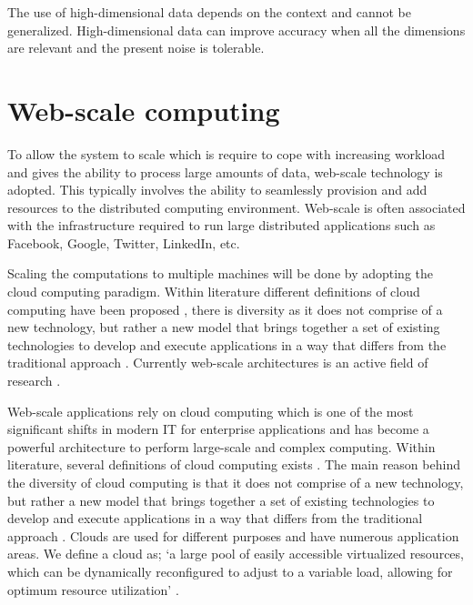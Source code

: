 The use of high-dimensional data depends on the context and cannot be generalized. High-dimensional data can improve accuracy when all the dimensions are relevant and the present noise is tolerable.


\section{Web-scale computing \label{sec:webscale}}

To allow the system to scale which is require to cope with increasing workload and gives the ability to process large amounts of data, web-scale technology is adopted. This typically involves the ability to seamlessly provision and add resources to the distributed computing environment. Web-scale is often associated with the infrastructure required to run large distributed applications such as Facebook, Google, Twitter, LinkedIn, etc. 

Scaling the computations to multiple machines will be done by adopting the cloud computing paradigm. Within literature different definitions of cloud computing have been proposed \cite{clouddef}, there is diversity as it does not comprise of a new technology, but rather a new model that brings together a set of existing technologies to develop and execute applications in a way that differs from the traditional approach \cite{zhang:cloud}. Currently web-scale architectures is an active field of research \cite{cherniack2003scalable}.

Web-scale applications rely on cloud computing which is one of the most significant shifts in modern IT for enterprise applications and has become a powerful architecture to perform large-scale and complex computing. Within literature, several definitions of cloud computing exists \cite{sathyavani}. The main reason behind the diversity of cloud computing is that it does not comprise of a new technology, but rather a new model that brings together a set of existing technologies to develop and execute applications in a way that differs from the traditional approach \cite{zhang:cloud}. Clouds are used for different purposes and have numerous application areas. We define a cloud as; `a large pool of easily accessible virtualized resources, which can be dynamically reconfigured to adjust to a variable load, allowing for optimum resource utilization' \cite{Vaquero:2008:BCT:1496091.1496100}. 

